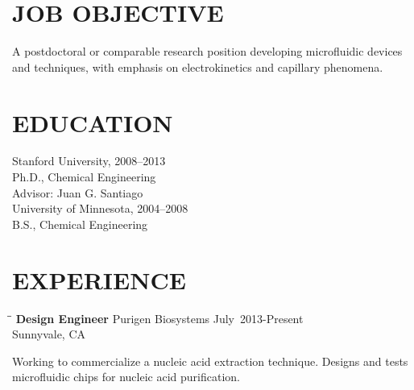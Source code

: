 \documentclass{res}
\begin{document}

\address{\bf  Address\\237 Ayrshire Farm Ln. \\ Apt. 103\\Stanford, CA 94305\\(650) 391-8463}

\address{\bf  Citizenship\\United States \\ \\ \bf E-Mail \\ lewis.a.marshall@gmail.com}

\begin{resume}

\section{JOB OBJECTIVE}
    A postdoctoral or comparable research position developing microfluidic devices and techniques, with emphasis on electrokinetics and capillary phenomena.

\section{EDUCATION}
		Stanford University, 2008--2013 \\
  		Ph.D., Chemical Engineering\\
  		Advisor: Juan G. Santiago\\  		

		University of Minnesota, 2004--2008 \\
  		B.S., Chemical Engineering\\


\section{EXPERIENCE}
   \vspace{-0.1in}

   \begin{tabbing}
   \hspace{2.1in}\= \hspace{2.9in}\= \kill %
    {\bf Design Engineer} \>Purigen Biosystems  \>July~2013-Present\\
                             \>Sunnyvale, CA
   \end{tabbing}\vspace{-20pt}      %
    Working to commercialize a nucleic acid extraction technique. Designs and tests microfluidic chips for nucleic acid purification.


\end{resume}
\end{document}
